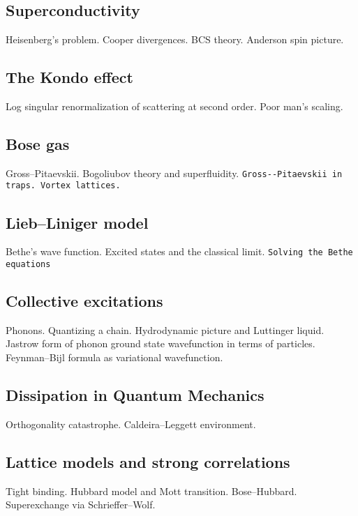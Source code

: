\subsection{Superconductivity}

Heisenberg's problem. Cooper divergences. BCS theory. Anderson spin picture.

\subsection{The Kondo effect}

Log singular renormalization of scattering at second order. Poor man's scaling.

\subsection{Bose gas}

Gross--Pitaevskii. Bogoliubov theory and superfluidity. \verb|Gross--Pitaevskii in traps. Vortex lattices.|

\subsection{Lieb--Liniger model}

Bethe's wave function. Excited states and the classical limit. \verb|Solving the Bethe equations|

\subsection{Collective excitations}

Phonons. Quantizing a chain. Hydrodynamic picture and Luttinger liquid. Jastrow form of phonon ground state wavefunction in terms of particles. Feynman–Bijl formula as variational wavefunction. 

\subsection{Dissipation in Quantum Mechanics}

Orthogonality catastrophe. Caldeira--Leggett environment.

\subsection{Lattice models and strong correlations}

Tight binding. Hubbard model and Mott transition. Bose--Hubbard. Superexchange via Schrieffer--Wolf.

